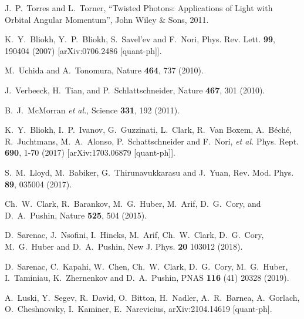 \documentclass[aps,prd,longbibliography,nofootinbib,amsthm,amsmath,amssymb,amsfonts,notitlepage]{revtex4-1}
\begin{document}
\begin{thebibliography}{99}
J.~P.~Torres and L.~Torner, ``Twisted Photons: Applications of Light with Orbital Angular Momentum'',
John Wiley \& Sons, 2011.


K.~Y.~Bliokh, Y.~P.~Bliokh, S.~Savel'ev and F.~Nori,
Phys. Rev. Lett. \textbf{99}, 190404 (2007)
[arXiv:0706.2486 [quant-ph]].

M.~Uchida and A.~Tonomura, Nature {\bf 464}, 737 (2010).

J.~Verbeeck, H.~Tian, and P.~Schlattschneider, Nature {\bf 467}, 301 (2010).

B.~J.~McMorran {\it et al.}, Science {\bf 331}, 192 (2011).

K.~Y.~Bliokh, I.~P.~Ivanov, G.~Guzzinati, L.~Clark, R.~Van Boxem, A.~B\'ech\'e, R.~Juchtmans, M.~A.~Alonso, P.~Schattschneider and F.~Nori, \textit{et al.}
Phys. Rept. \textbf{690}, 1-70 (2017)
[arXiv:1703.06879 [quant-ph]].

S.~M.~Lloyd, M.~Babiker, G.~Thirunavukkarasu and J.~Yuan,
Rev. Mod. Phys. {\bf 89}, 035004 (2017).

Ch.~W.~Clark, R.~Barankov, M.~G.~Huber, M.~Arif, D.~G.~Cory, and D.~A.~Pushin,
Nature {\bf 525}, 504 (2015).

D.~Sarenac, J.~Nsofini, I.~Hincks, M.~Arif, Ch.~W.~Clark, D.~G.~Cory, M.~G.~Huber and D.~A.~Pushin,
New J. Phys. {\bf 20} 103012 (2018).

D.~Sarenac, C.~Kapahi, W.~Chen, Ch.~W.~Clark, D.~G.~Cory, M.~G.~Huber, I.~Taminiau, K.~Zhernenkov and D.~A.~Pushin,
PNAS {\bf 116} (41) 20328 (2019).

A.~Luski, Y.~Segev, R.~David, O.~Bitton, H.~Nadler, A.~R.~Barnea, A.~Gorlach, O.~Cheshnovsky, I.~Kaminer, E.~Narevicius,
arXiv:2104.14619 [quant-ph].


\end{thebibliography}
\end{document}
